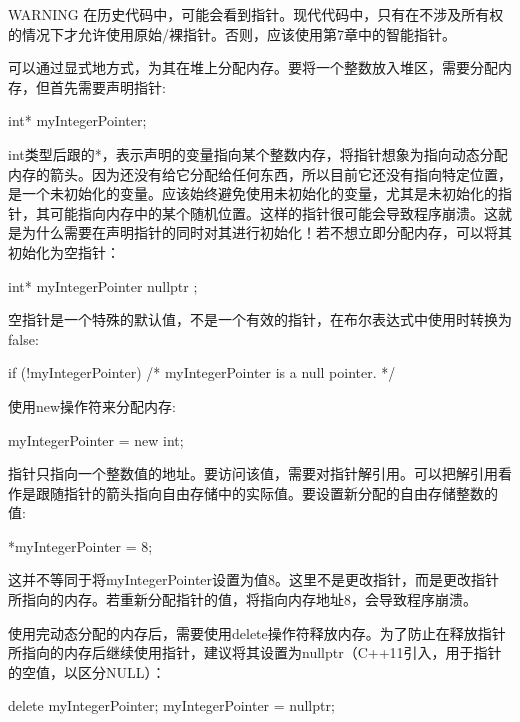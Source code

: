\begin{myWarning}{WARNING}
在历史代码中，可能会看到指针。现代代码中，只有在不涉及所有权的情况下才允许使用原始/裸指针。否则，应该使用第7章中的智能指针。
\end{myWarning}


可以通过显式地方式，为其在堆上分配内存。要将一个整数放入堆区，需要分配内存，但首先需要声明指针:

\begin{cpp}
int* myIntegerPointer;
\end{cpp}

int类型后跟的*，表示声明的变量指向某个整数内存，将指针想象为指向动态分配内存的箭头。因为还没有给它分配给任何东西，所以目前它还没有指向特定位置，是一个未初始化的变量。应该始终避免使用未初始化的变量，尤其是未初始化的指针，其可能指向内存中的某个随机位置。这样的指针很可能会导致程序崩溃。这就是为什么需要在声明指针的同时对其进行初始化！若不想立即分配内存，可以将其初始化为空指针：

\begin{cpp}
int* myIntegerPointer { nullptr };
\end{cpp}

空指针是一个特殊的默认值，不是一个有效的指针，在布尔表达式中使用时转换为false:

\begin{cpp}
if (!myIntegerPointer) { /* myIntegerPointer is a null pointer. */ }
\end{cpp}

使用new操作符来分配内存:

\begin{cpp}
myIntegerPointer = new int;
\end{cpp}

指针只指向一个整数值的地址。要访问该值，需要对指针解引用。可以把解引用看作是跟随指针的箭头指向自由存储中的实际值。要设置新分配的自由存储整数的值:

\begin{cpp}
*myIntegerPointer = 8;
\end{cpp}

这并不等同于将myIntegerPointer设置为值8。这里不是更改指针，而是更改指针所指向的内存。若重新分配指针的值，将指向内存地址8，会导致程序崩溃。

使用完动态分配的内存后，需要使用delete操作符释放内存。为了防止在释放指针所指向的内存后继续使用指针，建议将其设置为nullptr（C++11引入，用于指针的空值，以区分NULL）：

\begin{cpp}
delete myIntegerPointer;
myIntegerPointer = nullptr;
\end{cpp}


